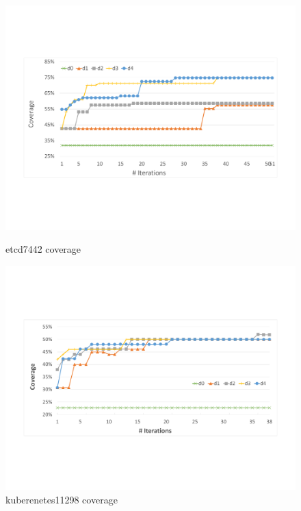 \begin{figure}[b]
\begin{minipage}{.48\textwidth}
\centering
  \includegraphics[width=.99\textwidth]{goat/figs/coverage_etcd7443.pdf}
  \caption{etcd7442 coverage}
  \label{fig:etcd_coverage}
\end{minipage}
\begin{minipage}{.48\textwidth}
\centering
  \includegraphics[width=.99\linewidth]{goat/figs/coverage_kubernetes11298.pdf}
  \caption{kuberenetes11298 coverage}
  \label{fig:kubernetes_coverage}
\end{minipage}
\end{figure}

